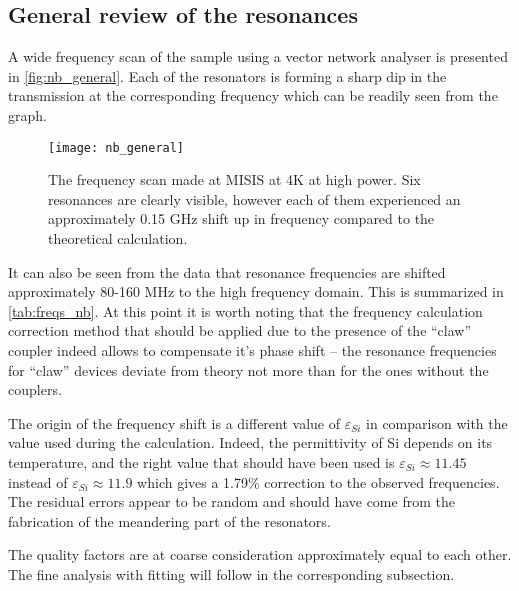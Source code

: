 \documentclass[12pt]{article}
\numberwithin{equation}{section}
\begin{document}
\subsection{General review of the resonances}

A wide frequency scan of the sample using a vector network analyser is presented in \autoref{fig:nb_general}. Each of the resonators is forming a sharp dip in the transmission at the corresponding frequency which can be readily seen from the graph. 

\begin{figure}[h!]
\centering
\texttt{[image: nb\_general]}
\caption{The frequency scan made at MISIS at 4K at high power. Six resonances are clearly visible, however each of them experienced an approximately 0.15 GHz shift up in frequency compared to the theoretical calculation.}
\label{fig:nb_general}
\end{figure}

It can also be seen from the data that resonance frequencies are shifted approximately 80-160 MHz to the high frequency domain. This is summarized in \autoref{tab:freqs_nb}. At this point it is worth noting that the frequency calculation correction method\cite{Sank2014} that should be applied due to the presence of the ``claw'' coupler indeed allows to compensate it's phase shift -- the resonance frequencies for ``claw'' devices deviate from theory not more than for the ones without the couplers. 

The origin of the frequency shift is a different value of $\varepsilon_{Si}$ in comparison with the value used during the calculation. Indeed, the permittivity of Si depends on its temperature\cite{Krupka2007}, and the right value that should have been used is $\varepsilon_{Si} \approx 11.45$ instead of $\varepsilon_{Si} \approx 11.9$ which gives a 1.79\% correction to the observed frequencies. The residual errors appear to be random and should have come from the fabrication of the meandering part of the resonators.

The quality factors are at coarse consideration approximately equal to each other. The fine analysis with fitting will follow in the corresponding subsection. 
\end{document}
